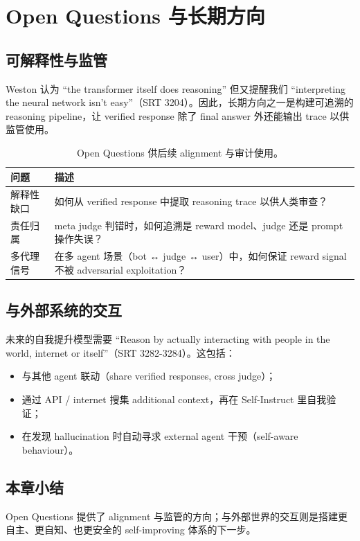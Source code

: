 \section{Open Questions 与长期方向}
\subsection{可解释性与监管}
Weston 认为 ``the transformer itself does reasoning'' 但又提醒我们 ``interpreting the neural network isn't easy''（SRT 3204）。因此，长期方向之一是构建可追溯的 reasoning pipeline，让 verified response 除了 final answer 外还能输出 trace 以供监管使用。

\begin{table}[H]
\centering
\begin{tabular}{p{5cm}p{10cm}}
\toprule
问题 & 描述 \\
\midrule
解释性缺口 & 如何从 verified response 中提取 reasoning trace 以供人类审查？ \\
责任归属 & meta judge 判错时，如何追溯是 reward model、judge 还是 prompt 操作失误？ \\
多代理信号 & 在多 agent 场景（bot ↔ judge ↔ user）中，如何保证 reward signal 不被 adversarial exploitation？ \\
\bottomrule
\end{tabular}
\caption{Open Questions 供后续 alignment 与审计使用。}
\end{table}

\subsection{与外部系统的交互}
未来的自我提升模型需要 ``Reason by actually interacting with people in the world, internet or itself''（SRT 3282-3284）。这包括：
\begin{itemize}
    \item 与其他 agent 联动（share verified responses, cross judge）；
    \item 通过 API / internet 搜集 additional context，再在 Self-Instruct 里自我验证；
    \item 在发现 hallucination 时自动寻求 external agent 干预（self-aware behaviour）。
\end{itemize}

\subsection{本章小结}
Open Questions 提供了 alignment 与监管的方向；与外部世界的交互则是搭建更自主、更自知、也更安全的 self-improving 体系的下一步。

